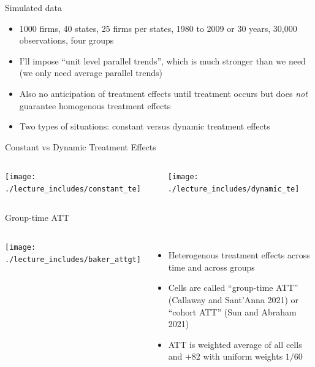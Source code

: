 \documentclass{beamer}
\begin{document}
\begin{frame}{Simulated data}

\begin{itemize}
\item 1000 firms, 40 states, 25 firms per states, 1980 to 2009 or 30 years, 30,000 observations, four groups

\item I'll impose ``unit level parallel trends'', which is much stronger than we need (we only need average parallel trends)

\item Also no anticipation of treatment effects until treatment occurs but does \emph{not} guarantee homogenous treatment effects

\item Two types of situations: constant versus dynamic treatment effects
\end{itemize}
\end{frame}



\begin{frame}{Constant vs Dynamic Treatment Effects}
    \begin{columns}
        \centering
        \texttt{[image: ./lecture\_includes/constant\_te]}

        \centering
        \texttt{[image: ./lecture\_includes/dynamic\_te]}
    \end{columns} 
\end{frame}



\begin{frame}{Group-time ATT}
       \begin{columns}
             \centering
             \texttt{[image: ./lecture\_includes/baker\_attgt]}
		\begin{itemize}
\item Heterogenous treatment effects across time and across groups
\item Cells are called ``group-time ATT'' (Callaway and Sant'Anna 2021) or ``cohort ATT'' (Sun and Abraham 2021)
\item ATT is weighted average of all cells and $+82$ with uniform weights $1/60$
		\end{itemize}
         \end{columns} 
    \end{frame}
    
\end{document}
